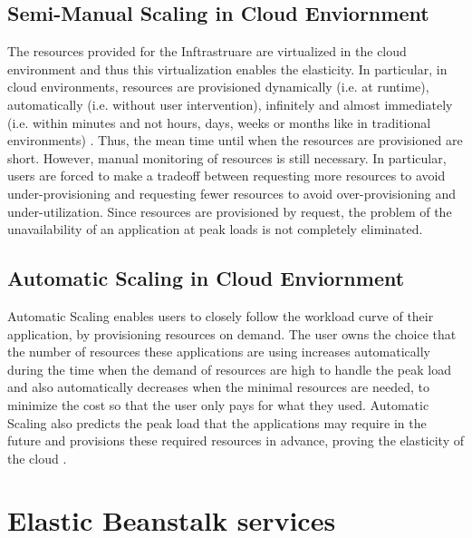 \documentclass[9pt,twocolumn,twoside]{../../styles/osajnl}
\begin{document}

\subsection{Semi-Manual Scaling in Cloud Enviornment}

The resources provided for the Inftrastruare are virtualized in the cloud
environment and thus this virtualization enables the elasticity. In
particular, in cloud environments, resources are provisioned
dynamically (i.e. at runtime), automatically (i.e. without user
intervention), infinitely and almost immediately (i.e. within minutes
and not hours, days, weeks or months like in traditional
environments) \cite{elastic-beanstalk}. Thus, the mean time until when
the resources are provisioned are short.  However, manual monitoring
of resources is still necessary. In particular, users are forced to
make a tradeoff between requesting more resources to avoid
under-provisioning and requesting fewer resources to avoid
over-provisioning and under-utilization. Since resources are
provisioned by request, the problem of the unavailability of an
application at peak loads is not completely eliminated.


\subsection{Automatic Scaling in Cloud Enviornment}

Automatic Scaling enables users to closely follow the workload curve
of their application, by provisioning resources on demand. The user
owns the choice that the number of resources these applications are
using increases automatically during the time when the demand of
resources are high to handle the peak load and also automatically
decreases when the minimal resources are needed, to minimize the cost
so that the user only pays for what they used. Automatic Scaling also
predicts the peak load that the applications may require in the future
and provisions these required resources in advance, proving the
elasticity of the cloud  \cite{elastic-beanstalk}.


\section{Elastic Beanstalk services}
\end{document}
